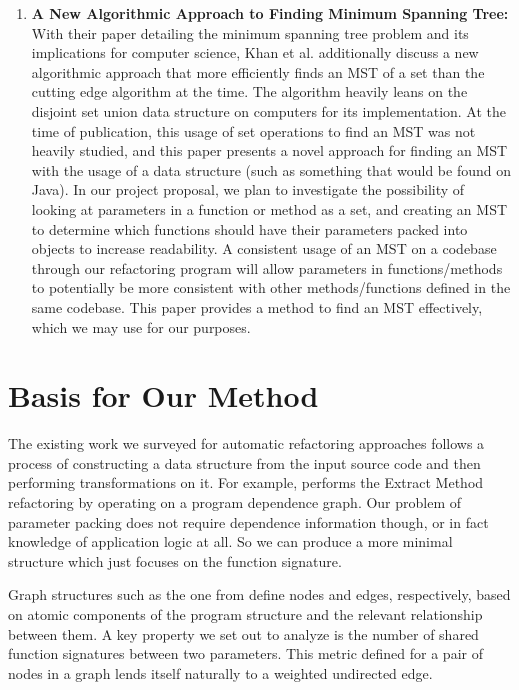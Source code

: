 \documentclass{article}
\begin{document}
\begin{enumerate}
  \item \textbf{A New Algorithmic Approach to Finding Minimum Spanning Tree:} With their paper detailing the minimum spanning tree problem and its implications for computer science, Khan et al.\cite{inproceedings} additionally discuss a new algorithmic approach that more efficiently finds an MST of a set than the cutting edge algorithm at the time. The algorithm heavily leans on the disjoint set union data structure on computers for its implementation. At the time of publication, this usage of set operations to find an MST was not heavily studied, and this paper presents a novel approach for finding an MST with the usage of a data structure (such as something that would be found on Java). In our project proposal, we plan to investigate the possibility of looking at parameters in a function or method as a set, and creating an MST to determine which functions should have their parameters packed into objects to increase readability. A consistent usage of an MST on a codebase through our refactoring program will allow parameters in functions/methods to potentially be more consistent with other methods/functions defined in the same codebase. This paper provides a method to find an MST effectively, which we may use for our purposes.
\end{enumerate}

\section{Basis for Our Method}

The existing work we surveyed for automatic refactoring approaches follows a process of constructing a data structure from the input source code and then performing transformations on it. For example, \cite{4812745} performs the Extract Method refactoring by operating on a program dependence graph. Our problem of parameter packing does not require dependence information though, or in fact knowledge of application logic at all. So we can produce a more minimal structure which just focuses on the function signature.

Graph structures such as the one from \cite{10.1145/3377811.3380922} define nodes and edges, respectively, based on atomic components of the program structure and the relevant relationship between them. A key property we set out to analyze is the number of shared function signatures between two parameters. This metric defined for a pair of nodes in a graph lends itself naturally to a weighted undirected edge.
\end{document}
